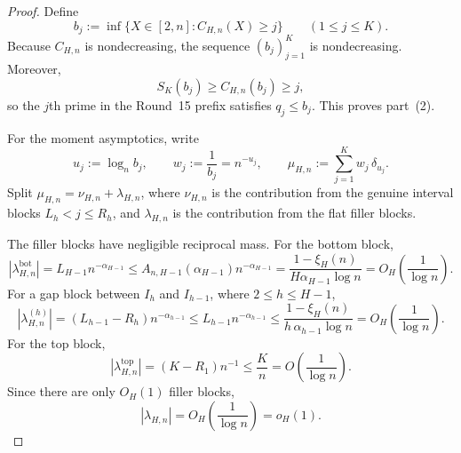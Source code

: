 \begin{proof}
Define
\[
  b_j := \inf\{X\in[2,n]: C_{H,n}(X)\ge j\}
  \qquad (1\le j\le K).
\]
Because $C_{H,n}$ is nondecreasing, the sequence $(b_j)_{j=1}^K$ is
nondecreasing.  Moreover,
\[
  S_K(b_j)\ge C_{H,n}(b_j)\ge j,
\]
so the $j$th prime in the Round~15 prefix satisfies $q_j\le b_j$.  This proves
part~(2).

For the moment asymptotics, write
\[
  u_j := \log_n b_j,
  \qquad
  w_j := \frac{1}{b_j}=n^{-u_j},
  \qquad
  \mu_{H,n} := \sum_{j=1}^K w_j\,\delta_{u_j}.
\]
Split $\mu_{H,n}=\nu_{H,n}+\lambda_{H,n}$, where $\nu_{H,n}$ is the
contribution from the genuine interval blocks
$L_h<j\le R_h$, and $\lambda_{H,n}$ is the contribution from the flat filler
blocks.

The filler blocks have negligible reciprocal mass.  For the bottom block,
\[
  |\lambda_{H,n}^{\mathrm{bot}}|
  =
  L_{H-1}n^{-\alpha_{H-1}}
  \le
  A_{n,H-1}(\alpha_{H-1})n^{-\alpha_{H-1}}
  =
  \frac{1-\xi_H(n)}{H\alpha_{H-1}\log n}
  =
  O_H\!\left(\frac1{\log n}\right).
\]
For a gap block between $I_h$ and $I_{h-1}$, where $2\le h\le H-1$,
\[
  |\lambda_{H,n}^{(h)}|
  =
  (L_{h-1}-R_h)n^{-\alpha_{h-1}}
  \le
  L_{h-1}n^{-\alpha_{h-1}}
  \le
  \frac{1-\xi_H(n)}{h\,\alpha_{h-1}\log n}
  =
  O_H\!\left(\frac1{\log n}\right).
\]
For the top block,
\[
  |\lambda_{H,n}^{\mathrm{top}}|
  =
  (K-R_1)n^{-1}
  \le
  \frac{K}{n}
  =
  O\!\left(\frac1{\log n}\right).
\]
Since there are only $O_H(1)$ filler blocks,
\[
  |\lambda_{H,n}|
  =
  O_H\!\left(\frac1{\log n}\right)
  =
  o_H(1).
\]


\end{proof}
